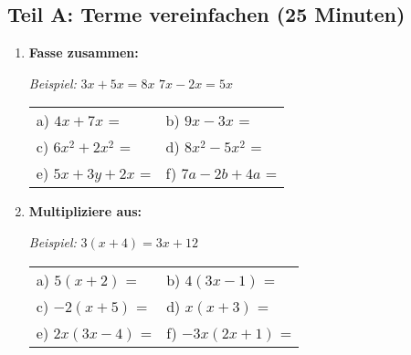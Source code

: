 \subsection*{Teil A: Terme vereinfachen (25 Minuten)}

\begin{enumerate}[label=\arabic*.]

    \item \textbf{Fasse zusammen:}

    \textit{Beispiel:} $3x + 5x = 8x$ \hspace{2cm} $7x - 2x = 5x$

    \vspace{0.5cm}
    \begin{tabular}{ll}
        a) $4x + 7x$ = \underline{\hspace{3cm}} & b) $9x - 3x$ = \underline{\hspace{3cm}} \\[2ex]
        c) $6x^2 + 2x^2$ = \underline{\hspace{3cm}} & d) $8x^2 - 5x^2$ = \underline{\hspace{3cm}} \\[2ex]
        e) $5x + 3y + 2x$ = \underline{\hspace{3cm}} & f) $7a - 2b + 4a$ = \underline{\hspace{3cm}}
    \end{tabular}

    \vspace{1cm}

    \item \textbf{Multipliziere aus:}

    \textit{Beispiel:} $3(x + 4) = 3x + 12$

    \vspace{0.5cm}
    \begin{tabular}{ll}
        a) $5(x + 2)$ = \underline{\hspace{4cm}} & b) $4(3x - 1)$ = \underline{\hspace{4cm}} \\[2ex]
        c) $-2(x + 5)$ = \underline{\hspace{4cm}} & d) $x(x + 3)$ = \underline{\hspace{4cm}} \\[2ex]
        e) $2x(3x - 4)$ = \underline{\hspace{4cm}} & f) $-3x(2x + 1)$ = \underline{\hspace{4cm}}
    \end{tabular}


\end{enumerate}
